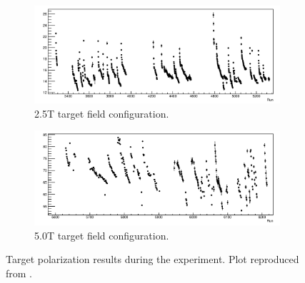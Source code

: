 \begin{figure}[p!]
  \centering
  \begin{subfigure}[t]{0.9\textwidth}
    \includegraphics[width=\textwidth]{figs/target-polarization-25.png}
    \caption{2.5T target field configuration. \label{C5S3SS3F2a}}
  \end{subfigure}
  \begin{subfigure}[t]{0.9\textwidth}
    \includegraphics[width=\textwidth]{figs/target-polarization-50.png}
    \caption{5.0T target field configuration. \label{C5S3SS3F2b}}
  \end{subfigure}
  \caption[Target polarization results.]{Target polarization results during the experiment. Plot reproduced from \cite{Badman2013}. \label{C5S3SS3F2}}
\end{figure}

